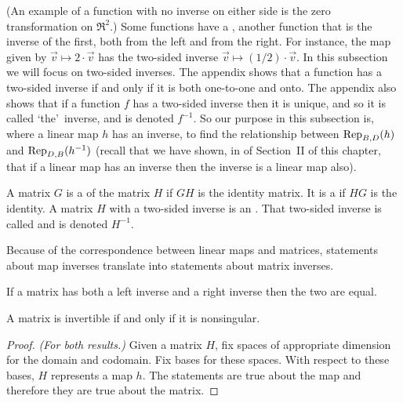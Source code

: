 \par\noindent (An example of a function with no inverse on either side
is the zero transformation on $\Re^2$.)
Some functions have a 
, 
another function
that is the inverse of the first, both from the left and from the right.
For instance, the map given by 
$\vec{v}\mapsto 2\cdot \vec{v}$ has the two-sided inverse 
$\vec{v}\mapsto (1/2)\cdot\vec{v}$.  
In this subsection we will focus on two-sided inverses.
The appendix shows that a function
has a two-sided inverse if and only if it is both one-to-one and onto.
The appendix also shows that if a function $f$ has a two-sided inverse then 
it is unique, and so it is called 
`the'~inverse,
and is denoted $f^{-1}$.
So our purpose in this subsection is, where a linear map $h$ has an inverse,
to find the relationship between $\rep{h}{B,D}$ and $\rep{h^{-1}}{D,B}$
(recall that we have shown, in 
of Section~II of this chapter, that if a linear map has an inverse
then the inverse is a linear map also). 

\begin{definition}
A matrix \( G \) is a 
of the matrix \( H \) if \( GH \) is the identity matrix.
It is a 
if \( HG \) is the identity.
A matrix $H$ with a two-sided inverse is an .
That two-sided inverse is called 
 and
is denoted \( H^{-1} \).
\end{definition}

Because of the correspondence between linear maps and matrices,
statements about map inverses translate into statements about matrix inverses.

\begin{lemma}     \label{le:LeftAndRightInvEqual}
If a matrix has both a left inverse and a right inverse then the two are equal.
\end{lemma}

\begin{theorem}
A matrix is invertible if and only if it is nonsingular.
\end{theorem}

\begin{proof}
\textit{(For both results.)}
Given a matrix $H$, fix spaces of appropriate dimension for the domain
and codomain.
Fix bases for these spaces.
With respect to these bases, $H$ represents a map $h$.
The statements are true about the map and therefore they are true about the
matrix.
\end{proof}

